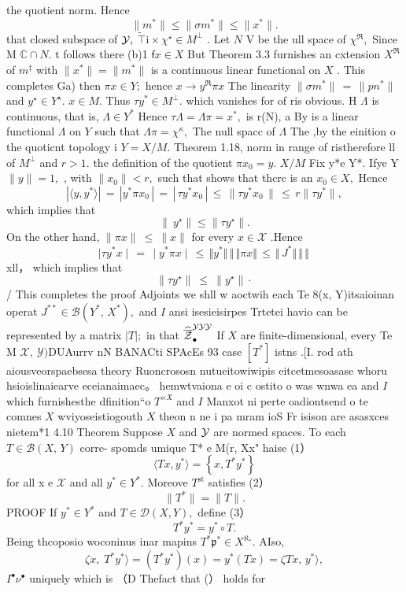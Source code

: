 the quotient norm. Hence $$ \|m^{*}\|\leq\|\sigma m^{*}\|\leq\|x^{*}\|. $$ that closed subspace of ${\cal{Y}},$ $\tilde{\top}\mathrm{i}\times\chi^{\star}\in M^{\perp}$ . Let $\textstyle{N}$ V be the ull space of $\chi^{\Re},$ Since M $\mathbb{C}\cap N.$ t follows there (b)1 $\textsf{f}x\in X$ But Theorem 3.3 furnishes an cxtension $X^{\Re}$ of $m^{\ddagger}$ with $\|x^{\ast}\|=\|m^{\ast}\|$ is a continuous linear functional on $\textstyle X$ . This completes Ga) then $\pi x\in Y;$ hence $x\to y^{\Re}\pi x$ The linearity $\|\sigma m^{*}\|\,=\,\|p n^{*}\|$ and $y^{\star}\in Y^{\star}.$ $x\in M.$ Thus $\tau y^{*}\in M^{\perp}.$ which vanishes for of ris obvious. H $\Lambda$ is continuous, that is, $\Lambda\in Y^{*}$ Hence $\tau\Lambda=\Lambda\pi=x^{*},$ is r(N), a By is a linear functional $\Lambda$ on ${\mathbf{}}Y$ such that $\Lambda\pi=\chi^{\kappa},$ The null spacc of $\Lambda$ The ,by the einition o the quoticnt topology i $Y=X/M.$ Theorem 1.18, norm in range of ristherefore ll of $M^{\perp}$ and $r>1.$ the definition of the quotient $\pi x_{0}=y.$ $X/M$ Fix y*e Y*. Ifye Y $\|y\|=1,$ , with $\|x_{0}\|<r,$ such that shows that thcrc is an $x_{0}\in X,$ Hence $$ |\langle y,y^{*}\rangle|\,=\,|y^{*}\pi x_{0}\,|\,=\,|\,\tau y^{*}x_{0}\,|\,\leq\,\|\tau y^{*}x_{0}\,\|\,\leq\,r\|\tau y^{*}\|, $$ which implies that $$ \|\ y^{\star}\|\leq\|\tau y^{\star}\|. $$ On the other hand, $\|\pi x\|\ \leq\ \|x\|$ for every $x\in{\mathcal{X}}$ .Hence $$ \mid\tau y^{*}x\mid\,=\,\mid y^{*}\pi x\mid\,\leq\,\Vert y^{*}\Vert\,\Vert\,\Vert\pi x\Vert\,\leq\,\Vert\,J^{*}\Vert\,\Vert\,\Vert\, $$ xll， which implies that $$ \lVert\tau y^{\star}\rVert\ \leq\ \lVert y^{\star}\rVert\cdot $$ / This completes the proof Adjoints we shll w aoctwih each Te 8(x, Y)itsaioinan operat $J^{**}\in{\mathcal{B}}(Y^{*},\,X^{*}),$ and $\boldsymbol{\mathit{I}}$ ansi isesieisirpes Trtetei havio can be represented by a matrix $|T|;$ in that $\widehat{\overline{{{\cal Z}}}}^{\mathcal{Y}\mathcal{Y}\mathcal{Y}}_{\bullet}$ If $\textstyle X$ are finite-dimensional, every Te M ${\mathcal{X}},\ {\mathcal{Y}})$DUAurrv nN BANACti SPAcEs 93 case $[T^{*}]$ istns .[I. rod ath aiousveorspaebsesa theory Ruoncrososn nutueitowiwipis eitcetmesoasase whoru hsioislinaiearve eceianaimaec。 hemwtvaiona e oi c ostito o was wnwa ea and $\boldsymbol{\mathit{I}}$ which furnishesthe dfinition“o $T^{\times{\mathfrak{X}}}$ and $\boldsymbol{\mathit{I}}$ Manxot ni perte oadiontsend o te comnes $X$ wviyoseistiogouth $\textstyle X$ theon n ne i pa mram ioS Fr isison are asasxces nietem*1 4.10 Theorem Suppose $\textstyle X$ and ${\cal{Y}}$ are normed spaces. To each $T\in{\mathcal{B}}(X,\,Y)$ corre- spomds umique T* e M(r, Xx" haise (1） $$ \displaystyle{\langle T x,y^{*}\rangle=\left\{x,T^{*}y^{*}\right\}} $$ for all x e $\textstyle{\mathcal{X}}$ and all $y^{*}\in Y^{*}.$ Moreove $T^{\mathrm{st}}$ satisfies (2） $$ \|T^{\ast}\|=\|T\|. $$ PROOF If $y^{*}\in Y^{*}$ and $T\in{\mathcal{D}}(X,Y),$ define (3） $$ T^{*}y^{*}=y^{*}\circ T. $$ Being thcoposio woconinus inar mapins $T^{*}{\mathfrak{p}}^{*}\in X^{\aleph_{*}}.$ AIso, $$ \zeta x,\;T^{*}y^{*}\rangle=(T^{*}y^{*})(x)=y^{*}(T x)=\zeta T x,\,y^{*}\rangle, $$ $\scriptstyle{I^{\bullet}}\nu^{\bullet}$ uniquely which is （D Thefact that (） holds for 